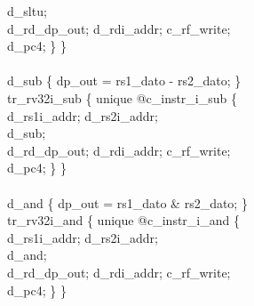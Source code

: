 {\indent \hspace{\parindent} d\_sltu; \\%
\indent \hspace{\parindent} d\_rd\_dp\_out; d\_rdi\_addr; c\_rf\_write;  \\%
\indent \hspace{\parindent} d\_pc4; \} \} \\%
\\
\indent d\_sub \{ dp\_out = rs1\_dato - rs2\_dato; \}\\%
\indent tr\_rv32i\_sub \{ unique @c\_instr\_i\_sub \{ \\%
\indent \hspace{\parindent} d\_rs1i\_addr; d\_rs2i\_addr; \\%
\indent \hspace{\parindent} d\_sub; \\%
\indent \hspace{\parindent} d\_rd\_dp\_out; d\_rdi\_addr; c\_rf\_write;  \\%
\indent \hspace{\parindent} d\_pc4; \} \} \\%
\\
\indent d\_and \{ dp\_out = rs1\_dato \& rs2\_dato; \}\\%
\indent tr\_rv32i\_and \{ unique @c\_instr\_i\_and \{ \\%
\indent \hspace{\parindent} d\_rs1i\_addr; d\_rs2i\_addr; \\%
\indent \hspace{\parindent} d\_and; \\%
\indent \hspace{\parindent} d\_rd\_dp\_out; d\_rdi\_addr; c\_rf\_write;  \\%
\indent \hspace{\parindent} d\_pc4; \} \} \\%
\\
}
